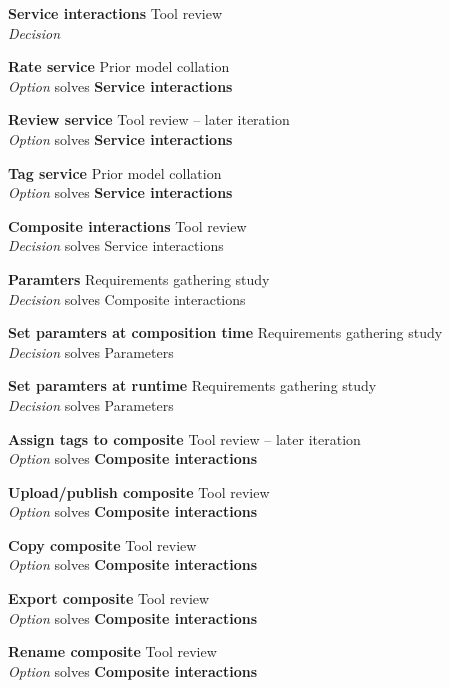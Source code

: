 
\textbf{Service interactions} \hfill Tool review \\ \emph{Decision} \hfill 

\textbf{Rate service} \hfill Prior model collation \cite{Grammel2010} \\ \emph{Option} \hfill solves \textbf{Service interactions}

\textbf{Review service} \hfill Tool review  -- later iteration \\ \emph{Option} \hfill solves \textbf{Service interactions}

\textbf{Tag service} \hfill Prior model collation \cite{Grammel2010} \\ \emph{Option} \hfill solves \textbf{Service interactions}

\textbf{Composite interactions} \hfill Tool review \\ \emph{Decision} \hfill solves {Service interactions}

\textbf{Paramters} \hfill Requirements gathering study \\ \emph{Decision} \hfill solves {Composite interactions}

\textbf{Set paramters at composition time} \hfill Requirements gathering study \\ \emph{Decision} \hfill solves {Parameters}

\textbf{Set paramters at runtime} \hfill Requirements gathering study \\ \emph{Decision} \hfill solves {Parameters}

\textbf{Assign tags to composite} \hfill Tool review  -- later iteration \\ \emph{Option} \hfill solves \textbf{Composite interactions}

\textbf{Upload/publish composite} \hfill Tool review \\ \emph{Option} \hfill solves \textbf{Composite interactions}

\textbf{Copy composite} \hfill Tool review \\ \emph{Option} \hfill solves \textbf{Composite interactions}

\textbf{Export composite} \hfill Tool review \\ \emph{Option} \hfill solves \textbf{Composite interactions}

\textbf{Rename composite} \hfill Tool review \\ \emph{Option} \hfill solves \textbf{Composite interactions}

